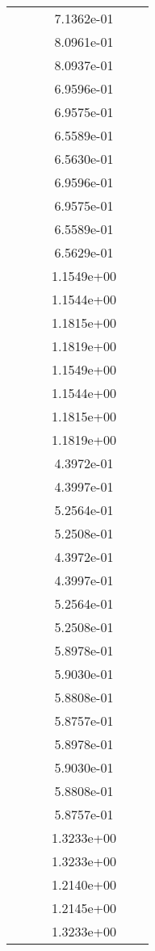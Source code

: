 \begin{xltabular}{\textwidth}{r|rS[table-format=1.3e+2]S[table-format=1.4e+2]S[table-format=1.4e+2]S[table-format=-1.5]}
&  &  & 7.1362e-01 & & \\
&  &  & 8.0961e-01 & & \\
&  &  & 8.0937e-01 & & \\
&  &  & 6.9596e-01 & & \\
&  &  & 6.9575e-01 & & \\
&  &  & 6.5589e-01 & & \\
&  &  & 6.5630e-01 & & \\
&  &  & 6.9596e-01 & & \\
&  &  & 6.9575e-01 & & \\
&  &  & 6.5589e-01 & & \\
&  &  & 6.5629e-01 & & \\
&  &  & 1.1549e+00 & & \\
&  &  & 1.1544e+00 & & \\
&  &  & 1.1815e+00 & & \\
&  &  & 1.1819e+00 & & \\
&  &  & 1.1549e+00 & & \\
&  &  & 1.1544e+00 & & \\
&  &  & 1.1815e+00 & & \\
&  &  & 1.1819e+00 & & \\
&  &  & 4.3972e-01 & & \\
&  &  & 4.3997e-01 & & \\
&  &  & 5.2564e-01 & & \\
&  &  & 5.2508e-01 & & \\
&  &  & 4.3972e-01 & & \\
&  &  & 4.3997e-01 & & \\
&  &  & 5.2564e-01 & & \\
&  &  & 5.2508e-01 & & \\
&  &  & 5.8978e-01 & & \\
&  &  & 5.9030e-01 & & \\
&  &  & 5.8808e-01 & & \\
&  &  & 5.8757e-01 & & \\
&  &  & 5.8978e-01 & & \\
&  &  & 5.9030e-01 & & \\
&  &  & 5.8808e-01 & & \\
&  &  & 5.8757e-01 & & \\
&  &  & 1.3233e+00 & & \\
&  &  & 1.3233e+00 & & \\
&  &  & 1.2140e+00 & & \\
&  &  & 1.2145e+00 & & \\
&  &  & 1.3233e+00 & & \\

\end{xltabular}
